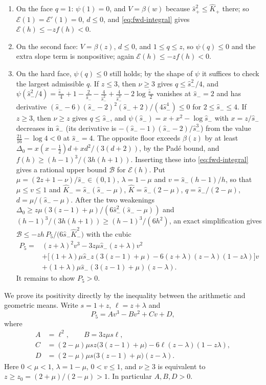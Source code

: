 \begin{enumerate}
\item On the face $q=1$: $\psi(1)=0$, and $V=\beta(w)$ because $\hat s_+^2\le\hat K_+$ there; so
  $\mathcal E(1)=\mathcal E'(1)=0$, $d\le0$, and \eqref{eq:fwd-integral} gives
  $\mathcal E(h)\le-zf(h)<0$.
\item On the second face: $V=\beta(z)$, $d\le0$, and $1\le q\le z$, so $\psi(q)\le0$ and the extra
  slope term is nonpositive; again $\mathcal E(h)\le-zf(h)<0$.
\item On the hard face, $\psi(q)\le0$ still holds; by the shape of $\psi$ it suffices to check the
  largest admissible $q$. If $z\le3$, then $\nu\ge3$ gives $q\le\hat s_-^2/4$, and
  $\psi(\hat s_-^2/4)=\frac{\hat s_-}4+1-\frac2{\hat s_-}-\frac4{\hat s_-^2}+\frac4{\hat s_-^3}
  -2\log\frac{\hat s_-}2$ vanishes at $\hat s_-=2$ and has derivative
  $(\hat s_--6)(\hat s_--2)^2(\hat s_-+2)/(4\hat s_-^4)\le0$ for $2\le\hat s_-\le4$. If $z\ge3$, then
  $\nu\ge z$ gives $q\le\hat s_-$, and $\psi(\hat s_-)=x+x^2-\log\hat s_-$ with $x=z/\hat s_-$
  decreases in $\hat s_-$ (its derivative is $-(\hat s_--1)(\hat s_--2)/\hat s_-^3$) from the value
  $\frac{21}{16}-\log4<0$ at $\hat s_-=4$.
  The opposite floor exceeds $\beta(z)$ by at least $\Delta_0=x(x-\frac12)d+xd^2/(3(d+2))$, by the
  Pad\'e bound, and $f(h)\ge(h-1)^3/(3h(h+1))$. Inserting these into \eqref{eq:fwd-integral} gives
  a rational upper bound $\mathcal B$ for $\mathcal E(h)$. Put $\mu=(2z+1-\nu)/\hat s_-\in(0,1)$,
  $\lambda=1-\mu$ and $v=\hat s_-(h-1)/h$, so that $\mu\le v\le1$ and
  $\hat K_-=\hat s_-(\hat s_--\mu)$, $\hat K=\hat s_-(2-\mu)$, $q=\hat s_-/(2-\mu)$,
  $d=\mu/(\hat s_--\mu)$. After the two weakenings
  $\Delta_0\ge z\mu(3(z-1)+\mu)/(6\hat s_-^2(\hat s_--\mu))$ and
  $(h-1)^3/(3h(h+1))\ge(h-1)^3/(6h^2)$, an exact simplification gives
  $\mathcal B\le-zh\,P_5/\bigl(6\hat s_-\hat K_-^2\bigr)$ with the cubic
  \begin{align*}
  P_5={}&(z+\lambda)^2v^3-3z\mu\hat s_-(z+\lambda)v^2\\
   &+\bigl[(1+\lambda)\mu\hat s_-z(3(z-1)+\mu)-6(z+\lambda)(z-\lambda)(1-z\lambda)\bigr]v\\
   &+(1+\lambda)\mu\hat s_-(3(z-1)+\mu)(z-\lambda).
  \end{align*}
  It remains to show $P_5>0$.
\end{enumerate}

 We prove its positivity directly by the inequality between the
arithmetic and geometric means. Write $s=1+z$, $\ell=z+\lambda$ and
\[
 P_5=Av^3-Bv^2+Cv+D,
\]
where
\begin{align*}
 A&=\ell^2,\qquad B=3z\mu s\ell,\\
 C&=(2-\mu)\mu sz\bigl(3(z-1)+\mu\bigr)-6\ell(z-\lambda)(1-z\lambda),\\
 D&=(2-\mu)\mu s\bigl(3(z-1)+\mu\bigr)(z-\lambda).
\end{align*}
Here $0<\mu<1$, $\lambda=1-\mu$, $0<v\le1$, and $\nu\ge3$ is equivalent to
$z\ge z_0=(2+\mu)/(2-\mu)>1$. In particular $A,B,D>0$.


